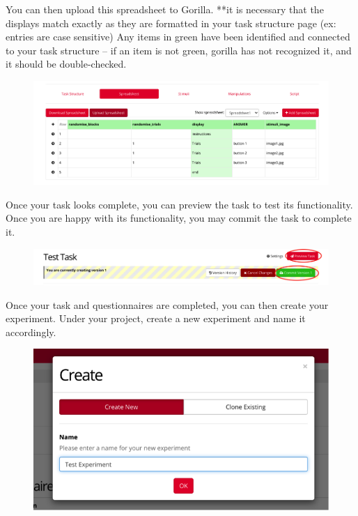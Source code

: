 \documentclass[]{book}
\begin{document}
You can then upload this spreadsheet to Gorilla. **it is necessary that the displays match exactly as they are formatted in your task structure page (ex: entries are case sensitive) Any items in green have been identified and connected to your task structure -- if an item is not green, gorilla has not recognized it, and it should be double-checked.

\begin{figure}
\centering
\includegraphics{images/research_protocols/gorilla/gorilla23.png}
\caption{}
\end{figure}

Once your task looks complete, you can preview the task to test its functionality. Once you are happy with its functionality, you may commit the task to complete it.

\begin{figure}
\centering
\includegraphics{images/research_protocols/gorilla/gorilla24.png}
\caption{}
\end{figure}

Once your task and questionnaires are completed, you can then create your experiment. Under your project, create a new experiment and name it accordingly.

\begin{figure}
\centering
\includegraphics{images/research_protocols/gorilla/gorilla25.png}
\caption{}
\end{figure}
\end{document}
